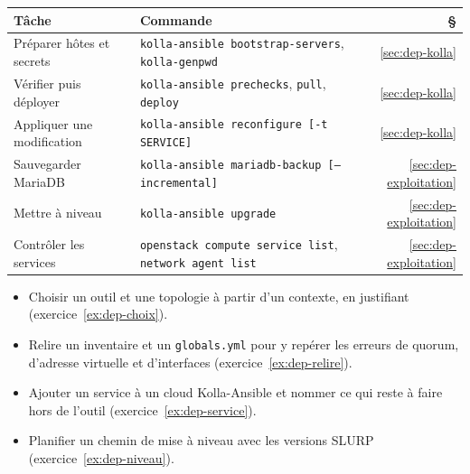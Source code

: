 \begin{center}
\renewcommand{\arraystretch}{1.3}
\begin{tabular}{@{}>{\raggedright\arraybackslash}p{4.0cm}>{\raggedright\arraybackslash}p{9.8cm}r@{}}
\toprule
\textbf{Tâche} & \textbf{Commande} & \textbf{§} \\
\midrule
Préparer hôtes et secrets & \texttt{kolla-ansible bootstrap-servers}, \texttt{kolla-genpwd} & \ref{sec:dep-kolla} \\
Vérifier puis déployer & \texttt{kolla-ansible prechecks}, \texttt{pull}, \texttt{deploy} & \ref{sec:dep-kolla} \\
Appliquer une modification & \texttt{kolla-ansible reconfigure [-t SERVICE]} & \ref{sec:dep-kolla} \\
Sauvegarder MariaDB & \texttt{kolla-ansible mariadb-backup [--incremental]} & \ref{sec:dep-exploitation} \\
Mettre à niveau & \texttt{kolla-ansible upgrade} & \ref{sec:dep-exploitation} \\
Contrôler les services & \texttt{openstack compute service list}, \texttt{network agent list} & \ref{sec:dep-exploitation} \\
\bottomrule
\end{tabular}
\end{center}

\begin{savoirfaire}
\begin{itemize}
  \item Choisir un outil et une topologie à partir d'un contexte, en justifiant (exercice~\ref{ex:dep-choix}).
  \item Relire un inventaire et un \texttt{globals.yml} pour y repérer les erreurs de quorum, d'adresse virtuelle et d'interfaces
        (exercice~\ref{ex:dep-relire}).
  \item Ajouter un service à un cloud Kolla-Ansible et nommer ce qui reste à faire hors de l'outil (exercice~\ref{ex:dep-service}).
  \item Planifier un chemin de mise à niveau avec les versions SLURP (exercice~\ref{ex:dep-niveau}).
\end{itemize}
\end{savoirfaire}
